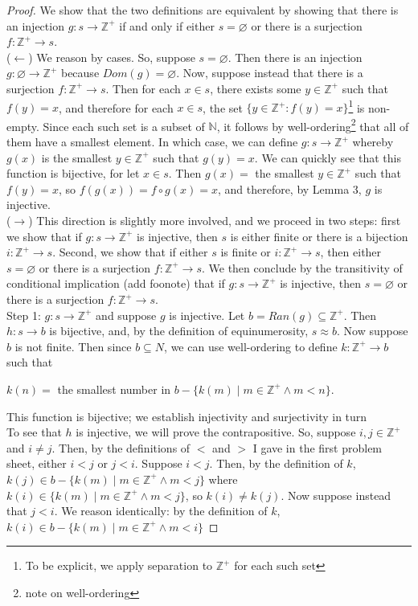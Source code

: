 \documentclass{article}
\begin{document}
\begin{proof}
We show that the two definitions are equivalent by showing that there is an injection $g: s \rightarrow \mathbb{Z^+}$ if and only if either $s = \varnothing$ or there is a surjection $f : \mathbb{Z^+} \rightarrow s$.\\ ($\leftarrow$) We reason by cases. So, suppose $s = \varnothing$. Then there is an injection $g: \varnothing \rightarrow \mathbb{Z^+}$ because $Dom(g) = \varnothing$. Now, suppose instead that there is a surjection $f: \mathbb{Z^+} \rightarrow s$. Then for each $x \in s$, there exists some $y \in \mathbb{Z^+}$ such that $f(y) = x$, and therefore for each $x \in s$, the set $\{ y \in \mathbb{Z^+} : f(y) = x \}$\footnote[1]{To be explicit, we apply separation to $\mathbb{Z^+}$ for each such set} is non-empty. Since each such set is a subset of $\mathbb{N}$, it follows by well-ordering\footnote[2]{note on well-ordering} that all of them have a smallest element. In which case, we can define $g: s \rightarrow \mathbb{Z^+}$ whereby $g(x)$ is the smallest $y \in \mathbb{Z^+}$ such that $g(y) = x$. We can quickly see that this function is bijective, for let $x \in s$.  Then $g(x) =$ the smallest $y \in \mathbb{Z^+}$ such that $f(y) = x$, so $f(g(x)) = f \circ g(x) = x$, and therefore, by Lemma 3,  $g$ is  injective. \\ ($\rightarrow$) This direction is slightly more involved, and we proceed in two steps: first we show that if $g: s \rightarrow \mathbb{Z^+}$ is injective, then $s$ is either finite or there is a bijection $i: \mathbb{Z^+} \rightarrow s$. Second, we show that if either $s$ is finite or $i: \mathbb{Z^+} \rightarrow s$, then either $s = \varnothing$ or there is a surjection $f:  \mathbb{Z^+} \rightarrow s$. We then conclude by the transitivity of conditional implication (add foonote) that if $g: s \rightarrow \mathbb{Z^+}$ is injective, then  $s = \varnothing$ or there is a surjection $f:  \mathbb{Z^+} \rightarrow s$.\\Step 1: \hspace{0.1cm} $g: s \rightarrow  \mathbb{Z^+}$ and suppose $g$ is injective. Let $b = Ran(g) \subseteq  \mathbb{Z^+}$. Then  $h: s \rightarrow b$ is bijective, and, by the definition of equinumerosity, $s \approx b$. Now suppose $b$ is not finite. Then since $b \subseteq N$, we can use well-ordering to define $k:  \mathbb{Z^+} \rightarrow b$ such that \begin{center} $k(n) =$ the smallest number in $b - \{ k(m) \mid m \in \mathbb{Z^+} \wedge m < n \}$. \end{center} This function is bijective; we establish injectivity and surjectivity in turn\\ To see that $h$ is injective, we will prove the contrapositive. So, suppose $i,j \in \mathbb{Z^+}$ and $ i \neq j$. Then, by the definitions of $<$ and $>$ I gave in the first problem sheet, either $i < j$ or $j < i$. Suppose $i < j$. Then, by the definition of $k$, $k(j) \in b - \{k(m) \mid m \in \mathbb{Z^+} \wedge m < j\}$ where $k(i) \in \{k(m) \mid m \in \mathbb{Z^+} \wedge m < j\}$, so $k(i) \neq k(j)$. Now suppose instead that $j < i$. We reason identically: by the definition of $k$, $k(i) \in b - \{k(m) \mid m \in \mathbb{Z^+} \wedge m < i\}$ 
\end{proof}
\end{document}
